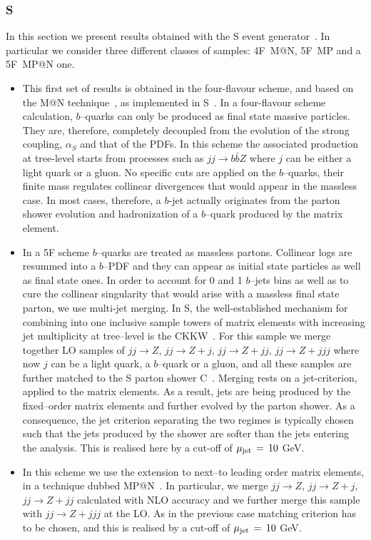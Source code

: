 \documentclass[11pt]{cernrep}
\makeatletter
\newcommand{\Sherpa}{S\protect\scalebox{0.8}{HERPA}\xspace}
\newcommand{\CSS}{C\protect\scalebox{0.8}{SS}\xspace}
\newcommand{\MCatNLO}{M\protect\scalebox{0.8}{C}@N\protect\scalebox{0.8}{LO}\xspace}
\newcommand{\MEPS}{M\scalebox{0.8}{E}P\scalebox{0.8}{S}\xspace}
\newcommand{\MEPSatNLO}{M\scalebox{0.8}{E}P\scalebox{0.8}{S}@N\protect\scalebox{0.8}{LO}\xspace}
\makeatother
\begin{document}
\subsubsection{\protect\Sherpa }
In this section we present results obtained with the \Sherpa event
generator~\cite{Gleisberg:2008ta}. In particular we consider three different
classes of samples: 4F~\MCatNLO, 5F~\MEPS and a 5F~\MEPSatNLO one.
\begin{itemize}
\item[4F \MCatNLO : ]{ This first set of results is obtained in the
  four-flavour scheme, and based on the \MCatNLO
  technique~\cite{Frixione:2002ik}, as implemented in
  \Sherpa~\cite{Hoeche:2011fd}. In a four-flavour scheme calculation,
  $b$--quarks can only be produced as final state massive particles. They
  are, therefore, completely decoupled from the evolution of the strong
  coupling, $\alpha_S$ and that of the PDFs. In this scheme the associated
  production at tree-level starts from processes such as $jj \to b\bar{b}Z$
  where $j$ can be either a light quark or a gluon. No specific cuts are
  applied on the $b$--quarks, their finite mass regulates collinear
  divergences that would appear in the massless case. In most cases,
  therefore, a $b$-jet actually originates from the parton shower evolution
  and hadronization of a $b$--quark produced by the matrix element.}
\item[5F~\MEPS :]{ In a 5F scheme $b$--quarks are treated as massless
  partons. Collinear logs are resummed into a $b$--PDF and they can appear as
  initial state particles as well as final state ones. In order to account
  for 0 and 1 $b$--jets bins as well as to cure the collinear singularity
  that would arise with a massless final state parton, we use multi-jet
  merging. In \Sherpa, the well-established mechanism for combining into one
  inclusive sample towers of matrix elements with increasing jet multiplicity
  at tree--\-level is the CKKW~\cite{Catani:2001cc}.  For this sample we
  merge together LO samples of $jj \to Z$, $jj \to Z+j$, $jj \to Z+jj$, $jj
  \to Z+jjj$ where now $j$ can be a light quark, a $b$--quark or a gluon, and
  all these samples are further matched to the \Sherpa parton shower
  \CSS~\cite{Schumann:2007mg}.  Merging rests on a jet-criterion, applied to
  the matrix elements.  As a result, jets are being produced by the
  fixed--order matrix elements and further evolved by the parton shower.  As
  a consequence, the jet criterion separating the two regimes is typically
  chosen such that the jets produced by the shower are softer than the jets
  entering the analysis.  This is realised here by a cut-off of $\mu_{\rm
    jet}\,=\, 10 $ GeV.}
	
\item[5F~\MEPSatNLO : ]{ In this scheme we use the extension to next--to
  leading order matrix elements, in a technique dubbed
  \MEPSatNLO~\cite{Hoeche:2012yf}.  In particular, we merge $jj \to Z$, $jj
  \to Z+j$, $jj \to Z+jj$ calculated with NLO accuracy and we further merge
  this sample with $jj \to Z+jjj$ at the LO.  As in the previous case
  matching criterion has to be chosen, and this is realised by a cut-off of
  $\mu_{\rm jet}\,=\, 10 $ GeV.}
\end{itemize}
\end{document}

